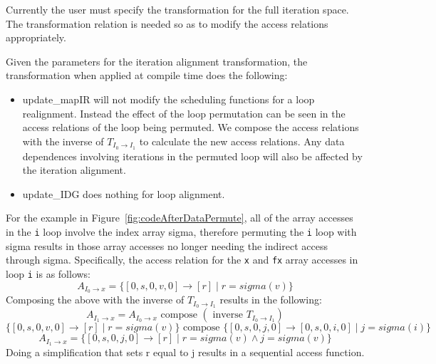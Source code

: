 \documentclass{article}
\begin{document}
Currently the user must specify the transformation for the full iteration space.
The transformation relation is needed so as to modify the access relations appropriately.

Given the parameters for the iteration alignment transformation, 
the transformation when applied at compile time does the following:
	\begin{itemize}	
\item update\_mapIR will not modify the scheduling functions for a loop realignment.  
Instead the effect of the loop permutation can be seen in the access relations of the loop being permuted.  We compose the access relations with the inverse of $T_{I_0 \rightarrow I_1}$ to calculate the new access relations.  
Any data dependences involving iterations in the permuted loop will also be affected by the iteration alignment. 
\item update\_IDG does nothing for loop alignment.
\end{itemize}
For the example in Figure~\ref{fig:codeAfterDataPermute}, all of the array accesses in the {\tt i} loop involve the index array sigma, therefore permuting the {\tt i} loop with sigma results in those array accesses no longer needing
the indirect access through sigma.  
Specifically, the access relation for the {\tt x} and {\tt fx} array accesses in loop {\tt i} is as follows:
\[
	A_{I_0 \rightarrow x} = \{ [0,s,0,v,0] \rightarrow [r] \; | \; r = sigma(v) \}
\]
Composing the above with the inverse of $T_{I_0 \rightarrow I_1}$ results in the following:
\[
	 A_{I_1 \rightarrow x} = A_{I_0 \rightarrow x} \mbox{ compose } (\mbox{ inverse } T_{I_0 \rightarrow I_1})
\]
\[
\{ [0,s,0,v,0] \rightarrow [r] \; | \; r = sigma(v) \} \mbox{ compose } \{[0, s, 0, j, 0 ] \rightarrow [ 0, s, 0, i, 0] \; | \; j = sigma(i) \}
\]
\[
	A_{I_1 \rightarrow x} = \{ [0, s, 0, j, 0 ] \rightarrow  [r]  \; | \; r = sigma(v) \wedge j = sigma(v) \}
\]
Doing a simplification that sets r equal to j results in a sequential access function.
\end{document}
